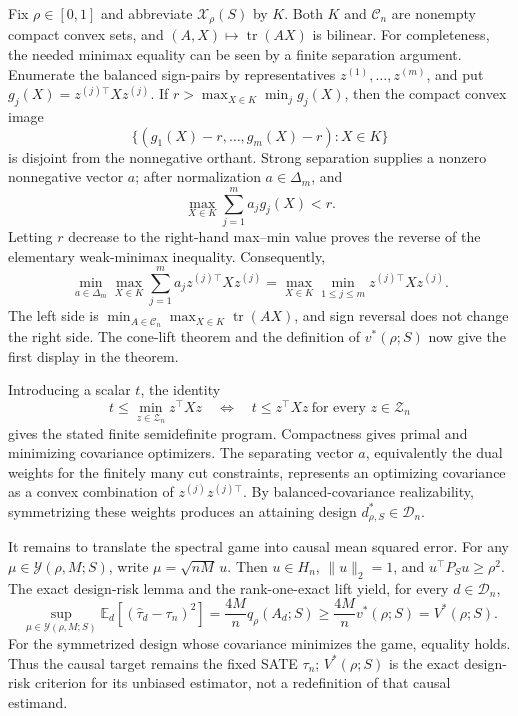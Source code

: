 Fix \(\rho\in[0,1]\) and abbreviate \(\mathcal X_\rho(S)\) by \(K\).  Both \(K\) and \(\mathcal C_n\) are nonempty compact convex sets, and \((A,X)\mapsto\operatorname{tr}(AX)\) is bilinear.  For completeness, the needed minimax equality can be seen by a finite separation argument.  Enumerate the balanced sign-pairs by representatives \(z^{(1)},\ldots,z^{(m)}\), and put \(g_j(X)=z^{(j)\top}Xz^{(j)}\).  If
\(r>\max_{X\in K}\min_j g_j(X)\), then the compact convex image
\[
\{(g_1(X)-r,\ldots,g_m(X)-r):X\in K\}
\]
is disjoint from the nonnegative orthant.  Strong separation supplies a nonzero nonnegative vector \(a\); after normalization \(a\in\Delta_m\), and
\[
\max_{X\in K}\sum_{j=1}^m a_jg_j(X)<r.
\]
Letting \(r\) decrease to the right-hand max--min value proves the reverse of the elementary weak-minimax inequality.  Consequently,
\[
\min_{a\in\Delta_m}\max_{X\in K}
\sum_{j=1}^m a_jz^{(j)\top}Xz^{(j)}
=\max_{X\in K}\min_{1\leq j\leq m}z^{(j)\top}Xz^{(j)}.
\]
The left side is \(\min_{A\in\mathcal C_n}\max_{X\in K}\operatorname{tr}(AX)\), and sign reversal does not change the right side.  The cone-lift theorem and the definition of \(v^*(\rho;S)\) now give the first display in the theorem.

Introducing a scalar \(t\), the identity
\[
t\leq\min_{z\in\mathcal Z_n}z^\top Xz
\quad\Longleftrightarrow\quad
t\leq z^\top Xz\ \text{for every }z\in\mathcal Z_n
\]
gives the stated finite semidefinite program.  Compactness gives primal and minimizing covariance optimizers.  The separating vector \(a\), equivalently the dual weights for the finitely many cut constraints, represents an optimizing covariance as a convex combination of \(z^{(j)}z^{(j)\top}\).  By balanced-covariance realizability, symmetrizing these weights produces an attaining design \(d^*_{\rho,S}\in\mathcal D_n\).

It remains to translate the spectral game into causal mean squared error.  For any \(\mu\in\mathcal Y(\rho,M;S)\), write \(\mu=\sqrt{nM}\,u\).  Then \(u\in H_n\), \(\|u\|_2=1\), and \(u^\top P_Su\geq\rho^2\).  The exact design-risk lemma and the rank-one-exact lift yield, for every \(d\in\mathcal D_n\),
\[
\sup_{\mu\in\mathcal Y(\rho,M;S)}
\mathbb E_d[(\widehat\tau_d-\tau_n)^2]
=\frac{4M}{n}q_\rho(A_d;S)
\geq\frac{4M}{n}v^*(\rho;S)=V^*(\rho;S).
\]
For the symmetrized design whose covariance minimizes the game, equality holds.  Thus the causal target remains the fixed SATE \(\tau_n\); \(V^*(\rho;S)\) is the exact design-risk criterion for its unbiased estimator, not a redefinition of that causal estimand.